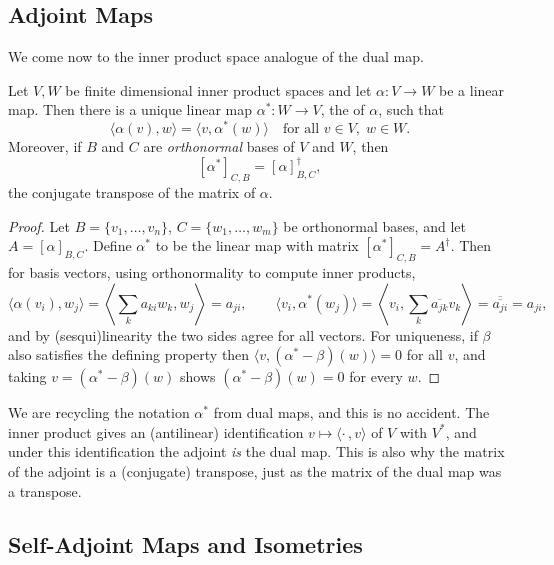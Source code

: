 \subsection{Adjoint Maps}

We come now to the inner product space analogue of the dual map.

\begin{theorem}
    Let $V, W$ be finite dimensional inner product spaces and let $\alpha: V \rightarrow W$ be a linear map. Then there is a unique linear map $\alpha^*: W \rightarrow V$, the  of $\alpha$, such that
    $$
    \langle \alpha(v), w \rangle = \langle v, \alpha^*(w)\rangle \quad \text{for all } v \in V,\; w \in W.
    $$
    Moreover, if $B$ and $C$ are \emph{orthonormal} bases of $V$ and $W$, then
    $$
    [\alpha^*]_{C, B} = [\alpha]_{B,C}^\dagger,
    $$
    the conjugate transpose of the matrix of $\alpha$.
\end{theorem}
\begin{proof}
    Let $B = \{v_1, \dots, v_n\}$, $C = \{w_1, \dots, w_m\}$ be orthonormal bases, and let $A = [\alpha]_{B, C}$. Define $\alpha^*$ to be the linear map with matrix $[\alpha^*]_{C,B} = A^\dagger$. Then for basis vectors, using orthonormality to compute inner products,
    $$
    \langle \alpha(v_i), w_j \rangle = \left\langle \sum_{k} a_{ki} w_k, w_j \right\rangle = a_{ji}, \qquad
    \langle v_i, \alpha^*(w_j) \rangle = \left\langle v_i, \sum_k \overline{a_{jk}} v_k \right\rangle = \overline{\overline{a_{ji}}} = a_{ji},
    $$
    and by (sesqui)linearity the two sides agree for all vectors. For uniqueness, if $\beta$ also satisfies the defining property then $\langle v, (\alpha^* - \beta)(w)\rangle = 0$ for all $v$, and taking $v = (\alpha^* - \beta)(w)$ shows $(\alpha^* - \beta)(w) = 0$ for every $w$.
\end{proof}

\begin{remark}
    We are recycling the notation $\alpha^*$ from dual maps, and this is no accident. The inner product gives an (antilinear) identification $v \mapsto \langle \cdot\,, v \rangle$ of $V$ with $V^*$, and under this identification the adjoint \emph{is} the dual map. This is also why the matrix of the adjoint is a (conjugate) transpose, just as the matrix of the dual map was a transpose.
\end{remark}

\subsection{Self-Adjoint Maps and Isometries}

